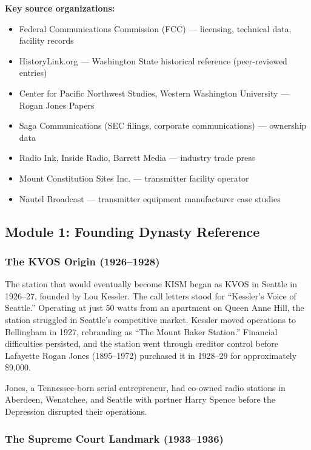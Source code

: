 \documentclass[11pt,letterpaper]{article}
\begin{document}
\textbf{Key source organizations:}
\begin{itemize}[nosep]
\item Federal Communications Commission (FCC) --- licensing, technical data, facility records
\item HistoryLink.org --- Washington State historical reference (peer-reviewed entries)
\item Center for Pacific Northwest Studies, Western Washington University --- Rogan Jones Papers
\item Saga Communications (SEC filings, corporate communications) --- ownership data
\item Radio Ink, Inside Radio, Barrett Media --- industry trade press
\item Mount Constitution Sites Inc. --- transmitter facility operator
\item Nautel Broadcast --- transmitter equipment manufacturer case studies
\end{itemize}

\subsection{Module 1: Founding Dynasty Reference}

\subsubsection{The KVOS Origin (1926--1928)}

The station that would eventually become KISM began as KVOS in Seattle in 1926--27, founded by Lou Kessler. The call letters stood for ``Kessler's Voice of Seattle.'' Operating at just 50 watts from an apartment on Queen Anne Hill, the station struggled in Seattle's competitive market. Kessler moved operations to Bellingham in 1927, rebranding as ``The Mount Baker Station.'' Financial difficulties persisted, and the station went through creditor control before Lafayette Rogan Jones (1895--1972) purchased it in 1928--29 for approximately \$9,000.

Jones, a Tennessee-born serial entrepreneur, had co-owned radio stations in Aberdeen, Wenatchee, and Seattle with partner Harry Spence before the Depression disrupted their operations.

\subsubsection{The Supreme Court Landmark (1933--1936)}
\end{document}
